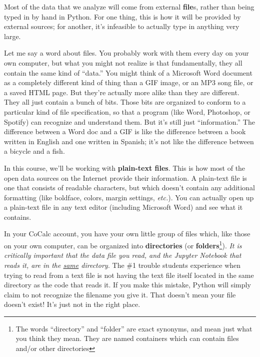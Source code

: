 Most of the data that we analyze will come from external \textbf{file}s, rather
than being typed in by hand in Python. For one thing, this is how it will be
provided by external sources; for another, it's infeasible to actually type in
anything very large.

Let me say a word about files. You probably work with them every day on your
own computer, but what you might not realize is that fundamentally, they all
contain the same kind of ``data.'' You might think of a Microsoft Word document
as a completely different kind of thing than a GIF image, or an MP3 song file,
or a saved HTML page. But they're actually more alike than they are different.
They all just contain a bunch of bits. Those bits are organized to conform to a
particular kind of file specification, so that a program (like Word, Photoshop,
or Spotify) can recognize and understand them. But it's still just
``information.'' The difference between a Word doc and a GIF is like the
difference between a book written in English and one written in Spanish; it's
not like the difference between a bicycle and a fish.

In this course, we'll be working with \textbf{plain-text files}. This is how
most of the open data sources on the Internet provide their information. A
plain-text file is one that consists of readable characters, but which doesn't
contain any additional formatting (like boldface, colors, margin settings,
\textit{etc.}). You can actually open up a plain-text file in any text editor
(including Microsoft Word) and see what it contains.


In your CoCalc account, you have your own little group of files which, like
those on your own computer, can be organized into \textbf{directories} (or
\textbf{folders}\footnote{The words ``directory'' and ``folder'' are exact
synonyms, and mean just what you think they mean. They are named containers
which can contain files and/or other directories}). \textit{It is
critically important that the data file you read, and the Jupyter Notebook that
reads it, are in the \underline{same} directory.} The \#1 trouble students
experience when trying to read from a text file is not having the text file
itself located in the same directory as the code that reads it. If you make
this mistake, Python will simply claim to not recognize the filename you give
it. That doesn't mean your file doesn't exist! It's just not in the right
place.

